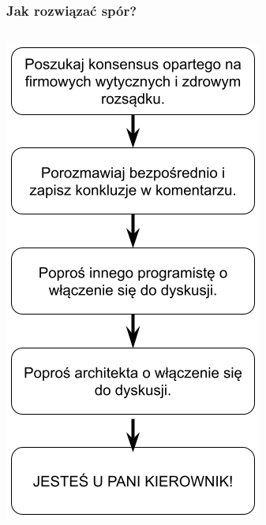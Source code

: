 \documentclass[xcolor=dvipsnames]{beamer}%
\begin{document}
\begin{frame}
	\frametitle{Jak rozwiązać spór?}
	\begin{columns}
		\begin{column}{0.5\textwidth}
			\begin{center}
				\includegraphics[width=\textwidth,height=0.8\textheight,keepaspectratio]{figure/rozwiazywanie_sporu.png}
			\end{center}

\end{column}
\end{columns}
\end{frame}
\end{document}
